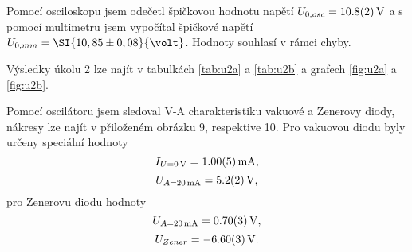 \documentclass[0-protokol.tex]{subfiles}
\begin{document}
Pomocí osciloskopu jsem odečetl špičkovou hodnotu napětí $U_{0, osc} = \SI{10,8 \pm 0,2}{V}$ a s pomocí multimetru jsem vypočítal špičkové napětí $U_{0, mm} = \SI{10,85 \pm 0,08}{\volt}$. Hodnoty souhlasí v rámci chyby.

Výsledky úkolu 2 lze najít v tabulkách \ref{tab:u2a} a \ref{tab:u2b} a grafech \ref{fig:u2a} a \ref{fig:u2b}.

Pomocí oscilátoru jsem sledoval V-A charakteristiku vakuové a Zenerovy diody, nákresy lze najít v přiloženém obrázku 9, respektive 10. Pro vakuovou diodu byly určeny speciální hodnoty
$$I_{U=\SI{0}{V}} = \SI{1 \pm 0,05}{mA},$$
$$U_{A=\SI{20}{mA}} = \SI{5,2 \pm 0,2}{V},$$
pro Zenerovu diodu hodnoty
$$U_{A=\SI{20}{mA}} = \SI{0,7 \pm 0,03}{V},$$
$$U_{Zener} = \SI{-6,6 \pm 0,03}{V}.$$
\end{document}
